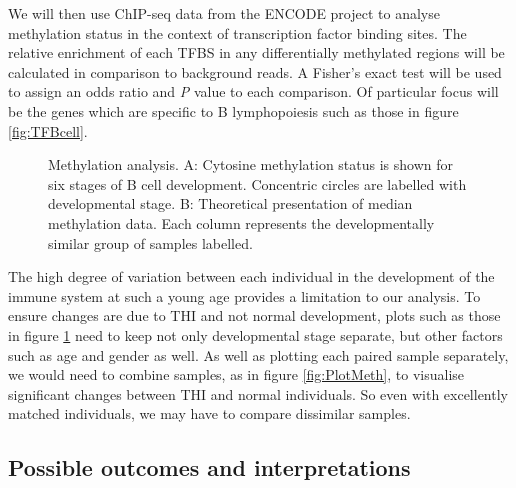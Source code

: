 \documentclass[12pt]{article}
\begin{document}
			We will then use ChIP-seq data from the ENCODE project \citep{ENCODE-Project-Consortium12} to analyse methylation status in the context of transcription factor binding sites.
			The relative enrichment of each TFBS in any differentially methylated regions will be calculated in comparison to background reads. 
			A Fisher's exact test will be used to assign an odds ratio and \textit{P} value to each comparison. 
			Of particular focus will be the genes which are specific to B lymphopoiesis such as those in figure \ref{fig:TFBcell}.

\begin{figure}[tb]
	\centering
		\caption{Methylation analysis. A: Cytosine methylation status is shown for six stages of B cell development. Concentric circles are labelled with developmental stage.  B: Theoretical presentation of median methylation data. Each column represents the developmentally similar group of samples labelled.}
		\label{fig:TheoPlots}
	\end{figure}
			
			The high degree of variation between each individual in the development of the immune system at such a young age provides a limitation to our analysis.
			To ensure changes are due to THI and not normal development, plots such as those in figure \ref{fig:TheoPlots} need to keep not only developmental stage separate, but other factors such as age and gender as well. 
			As well as plotting each paired sample separately, we would need to combine samples, as in figure \ref{fig:PlotMeth}, to visualise significant changes between THI and normal individuals.
			So even with excellently matched individuals, we may have to compare dissimilar samples.  

		\subsection{Possible outcomes and interpretations}
\end{document}
